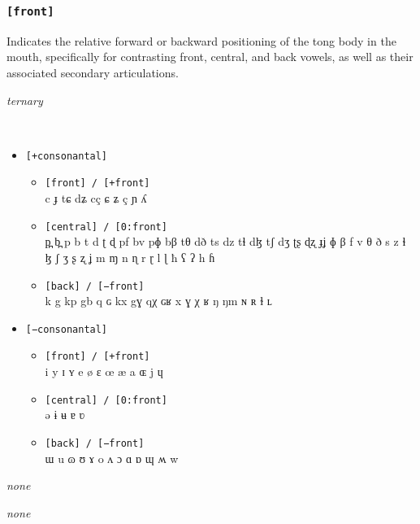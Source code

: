 \documentclass[10pt,letterpaper]{article}
\begin{document}
\subsubsection{\texttt{[front]}}
\label{ssub:feature_front}
\begin{samepage}
\begin{description}
\itemsep1pt \parskip0pt  
\item[Descritpion] Indicates the relative forward or backward positioning of the tong body in the mouth, specifically for contrasting front, central, and back vowels, as well as their associated secondary articulations.
\item[Type] \emph{ternary}
\item[Examples]\
  \begin{itemize}
    \item \texttt{[+consonantal]}
    \begin{itemize}
      \item \texttt{[front] / [+front]}\\
      c ɟ tɕ dʑ cç ɕ ʑ ç ɲ ʎ 
      \item \texttt{[central] / [0:front]}\\
      p̪ b̪ p b t d ʈ ɖ pf bv pɸ bβ tθ dð ts dz tɬ dɮ tʃ dʒ ʈʂ ɖʐ ɟʝ ɸ β f v θ ð s z ɬ ɮ ʃ ʒ ʂ ʐ ʝ m ɱ n ɳ r ɽ l ɭ ħ ʕ ʔ h ɦ 
      \item \texttt{[back] / [−front]}\\
      k g kp gb q ɢ kx gɣ qχ ɢʁ x ɣ χ ʁ ŋ ŋm ɴ ʀ ɫ ʟ 
    \end{itemize}
    \item  \texttt{[−consonantal]}
    \begin{itemize}
      \item \texttt{[front] / [+front]}\\
      i y ɪ ʏ e ø ɛ œ æ a ɶ j ɥ 
      \item \texttt{[central] / [0:front]}\\
      ə ɨ ʉ ɐ ʋ 
      \item \texttt{[back] / [−front]}\\
      ɯ u ɷ ʊ ɤ o ʌ ɔ ɑ ɒ ɰ ʍ w 
    \end{itemize}
  \end{itemize}
\item[Constraints] \emph{none}
\item[Resctrictions] \emph{none}
\end{description}
\end{samepage}
\end{document}

